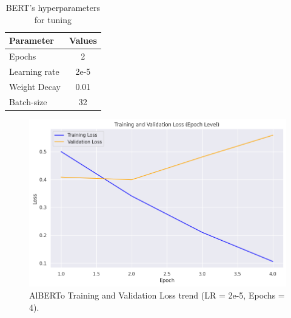 \begin{table}[h]
    \centering
    \begin{tabular}{|l|c|}
    \hline
    \textbf{Parameter} & \textbf{Values} \\ \hline
    Epochs & 2\\ \hline
    Learning rate & 2e-5\\ \hline
    Weight Decay & 0.01 \\ \hline
    Batch-size & 32 \\ \hline
    \end{tabular}
    \caption{BERT's hyperparameters for tuning}
    \label{tab:training_params}
\end{table}

\begin{figure}
    \includegraphics[width=\columnwidth]{../../results/images/alberto_losses_4epochs.png}
    \caption{AlBERTo Training and Validation Loss trend (LR = 2e-5, Epochs = 4).}
    \label{fig:example_losses}
\end{figure}
